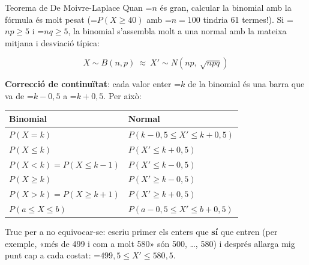 \documentclass[11pt,a4paper]{article}
\newcommand{\lt}{<}\newcommand{\gt}{>}
\newcommand{\fmm}[1]{\setbox0=\hbox{$#1$}\ifdim\wd0>\linewidth\[#1\]\else\mbox{\box0}\fi}
\begin{document}
  

  
\begin{fmprop}{Teorema de De Moivre-Laplace}
Quan \fmm{n} és gran, calcular la binomial amb la fórmula és molt pesat (\fmm{P(X\geq40)} amb \fmm{n=100} tindria 61 termes!). Si \fmm{np\geq5} i \fmm{nq\geq5}, la binomial s'assembla molt a una normal amb la mateixa mitjana i desviació típica:

      
\[X\sim B(n,p)\ \approx\ X'\sim N\!\left(np,\ \sqrt{npq}\right)\]

      

\textbf{Correcció de continuïtat}: cada valor enter \fmm{k} de la binomial és una barra que va de \fmm{k-0{,}5} a \fmm{k+0{,}5}. Per això:

      
\begin{center}\renewcommand{\arraystretch}{1.7}\small\begin{tabularx}{\linewidth}{>{\raggedright\arraybackslash}p{5.2cm}>{\centering\arraybackslash}X}\toprule
\textbf{Binomial} & \textbf{Normal}\\\midrule
$P(X=k)$ & $P(k-0{,}5\leq X'\leq k+0{,}5)$\\[3pt]
$P(X\leq k)$ & $P(X'\leq k+0{,}5)$\\[3pt]
$P(X\lt k)=P(X\leq k-1)$ & $P(X'\leq k-0{,}5)$\\[3pt]
$P(X\geq k)$ & $P(X'\geq k-0{,}5)$\\[3pt]
$P(X\gt k)=P(X\geq k+1)$ & $P(X'\geq k+0{,}5)$\\[3pt]
$P(a\leq X\leq b)$ & $P(a-0{,}5\leq X'\leq b+0{,}5)$\\[3pt]
\bottomrule\end{tabularx}\end{center}

      
\begin{fmnote}Truc per a no equivocar-se: escriu primer els enters que \textbf{sí} que entren (per exemple, «més de 499 i com a molt 580» són 500, \dots{}, 580) i després allarga mig punt cap a cada costat: \fmm{499{,}5\leq X'\leq580{,}5}.\end{fmnote}
\end{fmprop}
\end{document}
